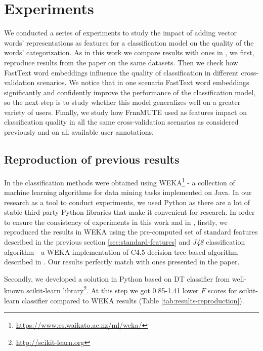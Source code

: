 \chapter{Experiments}
\label{ch:experiments}


We conducted a series of experiments to study the impact of adding vector words' representations as features for a classification model on the quality of the words' categorization. As in this work we compare results with ones in \citep{Grabar-PITR2014}, we first, reproduce results from the paper on the same datasets. Then we check how FastText word embeddings influence the quality of classification in different cross-validation scenarios. We notice that in one scenario FastText word embeddings significantly and confidently improve the performance of the classification model, so the next step is to study whether this model generalizes well on a greater variety of users. Finally, we study how FrnnMUTE used as features impact on classification quality in all the same cross-validation scenarios as considered previously and on all available user annotations.

\section{Reproduction of previous results}

In \citep{Grabar-PITR2014} the classification methods were obtained using WEKA\footnote{\url{https://www.cs.waikato.ac.nz/ml/weka/}} - a collection of machine learning algorithms for data mining tasks implemented on Java. In our research as a tool to conduct experiments, we used Python as there are a lot of stable third-party Python libraries that make it convenient for research. In order to ensure the consistency of experiments in this work and in \citep{Grabar-PITR2014}, firstly, we reproduced the results in WEKA using the pre-computed set of standard features described in the previous section \ref{sec:standard-features} and \textit{J48} classification algorithm - a WEKA implementation of C4.5 decision tree based algorithm described in \cite{Quinlan1993}. Our results perfectly match with ones presented in the paper. 

Secondly, we developed a solution in Python based on DT classifier from well-known scikit-learn library\footnote{\url{http://scikit-learn.org}}. At this step we got 0.85-1.41 lower $F$ scores for scikit-learn classifier compared to WEKA results (Table \ref{tab:results-reproduction}).

